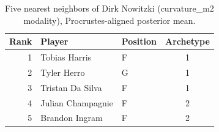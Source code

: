 \begin{table}[htbp]
  \centering\small
  \begin{tabular}{rllc}
    \toprule
    Rank & Player & Position & Archetype \\
    \midrule
    1 & Tobias Harris & F & 1 \\
    2 & Tyler Herro & G & 1 \\
    3 & Tristan Da Silva & F & 1 \\
    4 & Julian Champagnie & F & 2 \\
    5 & Brandon Ingram & F & 2 \\
    \bottomrule
  \end{tabular}
  \caption{Five nearest neighbors of Dirk Nowitzki (curvature_m2 modality), Procrustes-aligned posterior mean.}
  \label{tab:Dirk_Nowitzki_neighbors_curvature_m2}
\end{table}

